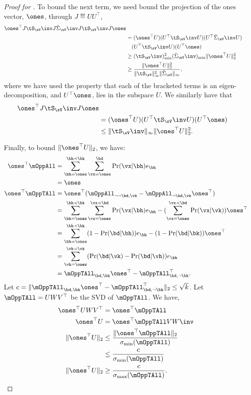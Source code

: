 \begin{proof}[Proof for ]
  To bound the next term, we need bound the projection of the ones
  vector, $\ones$, through $J \eqdef U U^\top$,
  \begin{align*}
      \ones^\top J \tS_\sV\inv J \tilde\Sigma_\sV\inv J \tS_\sV\inv J \ones \\
      &=
      (\ones^\top U) (U^\top \tS_\sV\inv U) (U^\top \tilde\Sigma_\sV\inv U) \\
      &\quad (U^\top \tS_\sV\inv U) (U^\top \ones)  \\
      &\ge 
      (\tS_\sV\inv)^2_{\min}
      (\tilde\Sigma_\sV\inv)_{\min}
      \|\ones^\top U\|^2_2 \\
      &\ge 
      \frac{\|\ones^\top U\|^2_2}{\|\tS_\sV\|^2_\infty \|\tilde\Sigma_\sV\|_\infty},
  \end{align*}
  where we have used the property that each of the bracketed terms is an
  eigen-decomposition, and $U^\top \ones$, lies in the subspace $U$.
  We similarly have that
  \begin{align*}
      \ones^\top J \tS_\sV\inv J \ones \\
      &=
      (\ones^\top U) (U^\top \tS_\sV\inv U) (U^\top \ones) \\
      &\le 
      \|\tS_\sV\inv\|_{\infty}
      \|\ones^\top U\|^2_2.
  \end{align*}

  Finally, to bound $\|\ones^\top U\|_2$, we have:
  \begin{align*}
    \ones^\top \mOppAll 
      &= \sum_{\bh = \ones}^{\bh \prec \bk} \sum_{\vx = \ones}^{\bd} \Pr(\vx | \bh) e_\bh  \\
      &= \ones \\
    \ones^\top \mOppTAll 
        &= \ones^\top (\mOppAll_{\neg \neg \bd, \vk} - \mOppAll_{\neg \bd, \vk}\ones^\top) \\
        &= \sum_{\bh = \ones}^{\bh \prec \bk} \sum_{\vx = \ones}^{\vx \prec \bd} \Pr(\vx | \bh) e_\bh - (\sum_{\vx = \ones}^{\vx \prec \bd} \Pr(\vx | \vk)) \ones^\top  \\
        &= \sum_{\bh = \ones}^{\bh \prec \bk} (1 - \Pr(\bd | \bh)) e_\bh - (1 - \Pr(\bd | \bk)) \ones^\top  \\
        &= \sum_{\vh = \ones}^{\vh \prec \vk} (\Pr(\bd | \vk) - \Pr(\bd | \vh))e_\bh \\
        &= \mOppTAll_{\bd,\bk} \ones^\top - \mOppTAll_{\bd,\neg \bk}^\top.
  \end{align*}
  Let $c = \|\mOppTAll_{\bd,\bk} \ones^\top - \mOppTAll_{\bd,\neg
  \bk}^\top\|_2 \le \sqrt{k}$.
  Let $\mOppTAll = U W V^\top$ be the SVD of $\mOppTAll$. We have,
  \begin{align*}
    \ones^\top U W V^\top 
        &= \ones^\top \mOppTAll \\
    \ones^\top U 
      &= \ones^\top \mOppTAll V W\inv \\
    \|\ones^\top U\|_2 
        &\le \frac{\|\ones^\top \mOppTAll\|_2}{\sigma_{\min}(\mOppTAll)} \\
        &\le \frac{c}{\sigma_{\min}(\mOppTAll)} \\
    \|\ones^\top U\|_2 
        &\ge \frac{c}{\sigma_{\max}(\mOppTAll)}.
  \end{align*}


\end{proof}
